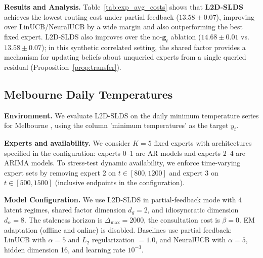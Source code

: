\textbf{Results and Analysis.}
Table~\ref{tab:exp_avg_costs} shows that \textbf{L2D-SLDS} achieves the lowest routing cost under
partial feedback (\(13.58\pm 0.07\)), improving over LinUCB/NeuralUCB by a wide margin and also
outperforming the best fixed expert. L2D-SLDS also improves over the no-\(\mathbf{g}_t\) ablation
(\(14.68\pm 0.01\) vs.\ \(13.58\pm 0.07\)); in this synthetic correlated setting, the shared factor
provides a mechanism for updating beliefs about unqueried experts from a single queried residual
(Proposition~\ref{prop:transfer}).

\subsection{Melbourne Daily Temperatures}
\label{sec:exp_melbourne}

\textbf{Environment.}
We evaluate L2D-SLDS on the daily minimum temperature series for Melbourne \citep{daily_min_temp_melbourne_kaggle}, using the column 'minimum temperatures' as the target \(y_t\). 

\textbf{Experts and availability.}
We consider \(K=5\) fixed experts with architectures specified in the configuration:
experts 0--1 are AR models and experts 2--4 are ARIMA models. To stress-test dynamic availability, we enforce time-varying expert sets by removing expert 2 on
\(t\in[800,1200]\) and expert 3 on \(t\in[500,1500]\) (inclusive endpoints in the configuration).  


\textbf{Model Configuration.}
We use L2D-SLDS in partial-feedback mode with 4 latent regimes, shared factor dimension
\(d_g=2\), and idiosyncratic dimension \(d_\alpha=8\). The staleness horizon is \(\Delta_{\max}=2000\), the consultation
cost is \(\beta=0\). EM adaptation (offline and online) is disabled. Baselines use partial feedback: LinUCB with \(\alpha=5\) and \(L_2\) regularization \(=1.0\), and NeuralUCB with
\(\alpha=5\), hidden dimension 16, and learning rate \(10^{-3}\).


